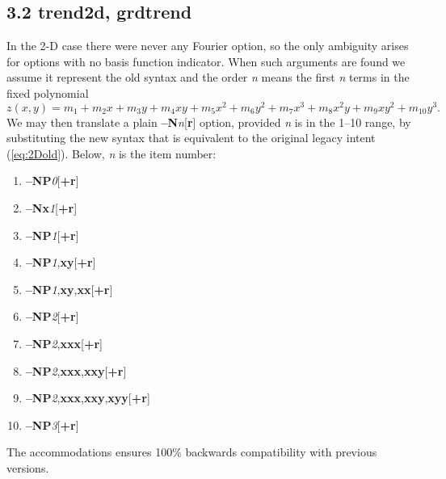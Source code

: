 \documentclass[12pt,letterpaper,margin=0.5in]{report}
\begin{document}
\subsection*{3.2 trend2d, grdtrend}
In the
2-D case there were never any Fourier option, so the only ambiguity arises for options
with no basis function indicator.  When such arguments are found we assume it represent
the old syntax and the order {\it n} means the first {\it n}
terms in the fixed polynomial
\begin{equation}
z(x,y) = m_1 + m_2 x + m_3 y + m_4 xy + m_5 x^2 + m_6 y^2 + m_7 x^3 + m_8 x^2y + m_9 xy^2 + m_{10} y^3.
\label{eq:2Dold}
\end{equation}
We may then translate a plain {\bf --N}{\it n}[{\bf r}] option, provided
{\it n} is in the 1--10 range, by substituting the new syntax that is equivalent to the original legacy intent (\ref{eq:2Dold}). Below, {\it n} is the item number:
\begin{enumerate}
	\item {\bf --NP}{\it 0}[{\bf +r}]
	\item {\bf --Nx}{\it 1}[{\bf +r}]
	\item {\bf --NP}{\it 1}[{\bf +r}]
	\item {\bf --NP}{\it 1},{\bf xy}[{\bf +r}]
	\item {\bf --NP}{\it 1},{\bf xy},{\bf xx}[{\bf +r}]
	\item {\bf --NP}{\it 2}[{\bf +r}]
	\item {\bf --NP}{\it 2},{\bf xxx}[{\bf +r}]
	\item {\bf --NP}{\it 2},{\bf xxx},{\bf xxy}[{\bf +r}]
	\item {\bf --NP}{\it 2},{\bf xxx},{\bf xxy},{\bf xyy}[{\bf +r}]
	\item {\bf --NP}{\it 3}[{\bf +r}]
\end{enumerate}
The accommodations ensures 100\% backwards compatibility with previous versions.
\end{document}
